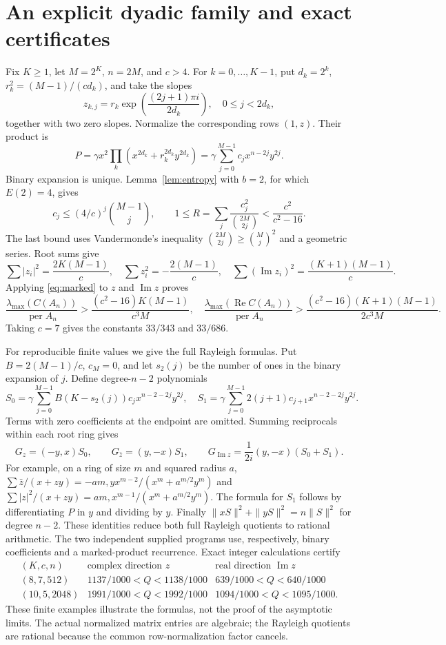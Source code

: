 \documentclass[11pt]{article}
\DeclareMathOperator{\per}{per}
\DeclareMathOperator{\Ree}{Re}
\DeclareMathOperator{\Imm}{Im}
\begin{document}
\section{An explicit dyadic family and exact certificates}
Fix $K\ge1$, let $M=2^K$, $n=2M$, and $c>4$. For $k=0,\ldots,K-1$, put
$d_k=2^k$, $r_k^2=(M-1)/(cd_k)$, and take the slopes
\[
 z_{k,j}=r_k\exp\left(\frac{(2j+1)\pi i}{2d_k}\right),
 \quad0\le j<2d_k,
\]
together with two zero slopes. Normalize the corresponding rows $(1,z)$.
Their product is
\[
 P=\gamma x^2\prod_k(x^{2d_k}+r_k^{2d_k}y^{2d_k})
  =\gamma\sum_{j=0}^{M-1}c_jx^{n-2j}y^{2j}.
\]
Binary expansion is unique. Lemma~\ref{lem:entropy} with $b=2$, for which
$E(2)=4$, gives
\[
 c_j\le(4/c)^j\binom{M-1}{j},\qquad
 1\le R=\sum_j\frac{c_j^2}{\binom{2M}{2j}}
     <\frac{c^2}{c^2-16}.
\]
The last bound uses Vandermonde's inequality
$\binom{2M}{2j}\ge\binom Mj^2$ and a geometric series. Root sums give
\[
 \sum|z_i|^2=\frac{2K(M-1)}c,\quad
 \sum z_i^2=-\frac{2(M-1)}c,\quad
 \sum(\Imm z_i)^2=\frac{(K+1)(M-1)}c.
\]
Applying \eqref{eq:marked} to $z$ and $\Imm z$ proves
\begin{equation}\label{eq:dyadic}
 \frac{\lambda_{\max}(C(A_n))}{\per A_n}
 >\frac{(c^2-16)K(M-1)}{c^3M},\quad
 \frac{\lambda_{\max}(\Ree C(A_n))}{\per A_n}
 >\frac{(c^2-16)(K+1)(M-1)}{2c^3M}.
\end{equation}
Taking $c=7$ gives the constants $33/343$ and $33/686$.

For reproducible finite values we give the full Rayleigh formulas. Put
$B=2(M-1)/c$, $c_M=0$, and let $s_2(j)$ be the number of ones in the binary
expansion of $j$. Define degree-$n-2$ polynomials
\[
 S_0=\gamma\sum_{j=0}^{M-1}B(K-s_2(j))c_jx^{n-2-2j}y^{2j},\quad
 S_1=\gamma\sum_{j=0}^{M-1}2(j+1)c_{j+1}x^{n-2-2j}y^{2j}.
\]
Terms with zero coefficients at the endpoint are omitted. Summing reciprocals
within each root ring gives
\[
 G_z=(-y,x)S_0,\qquad G_{\bar z}=(y,-x)S_1,
 \qquad G_{\Imm z}=\frac1{2i}(y,-x)(S_0+S_1).
\]
For example, on a ring of size $m$ and squared radius $a$,
$\sum\bar z/(x+zy)=-am,yx^{m-2}/(x^m+a^{m/2}y^m)$ and
$\sum|z|^2/(x+zy)=am,x^{m-1}/(x^m+a^{m/2}y^m)$.
The formula for $S_1$ follows by differentiating $P$ in $y$ and dividing by
$y$. Finally $\|xS\|^2+\|yS\|^2=n\|S\|^2$ for degree $n-2$.
These identities reduce both full Rayleigh quotients to rational arithmetic.
The two independent supplied programs use, respectively, binary coefficients
and a marked-product recurrence. Exact integer calculations certify
\[
 \begin{array}{c|c|c}
 (K,c,n)&\text{complex direction }z&\text{real direction }\Imm z\\\hline
 (8,7,512)&1137/1000<Q<1138/1000&639/1000<Q<640/1000\\
 (10,5,2048)&1991/1000<Q<1992/1000&1094/1000<Q<1095/1000.
 \end{array}
\]
These finite examples illustrate the formulas, not the proof of the asymptotic
limits. The actual normalized matrix entries are algebraic; the Rayleigh
quotients are rational because the common row-normalization factor cancels.
\end{document}
